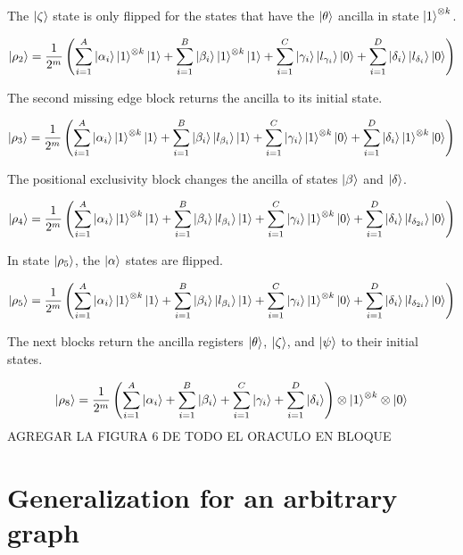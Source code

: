 \documentclass[10pt,a4paper]{article}
\begin{document}
The $\ket{\zeta}$ state is only flipped for the states that have the $\ket{\theta}$ ancilla in state $\ket{1}^{\otimes k}$.

$$
\ket{\rho_2} = \frac{1}{2^m} \left( \sum_{i=1}^{A} \ket{\alpha_i} \ket{1}^{\otimes k} \ket{1} + \sum_{i=1}^{B} \ket{\beta_i} \ket{1}^{\otimes k} \ket{1} + \sum_{i=1}^{C} \ket{\gamma_i} \ket{l_{\gamma_i}} \ket{0} + \sum_{i=1}^{D} \ket{\delta_i} \ket{l_{\delta_i}} \ket{0} \right)
$$

The second missing edge block returns the ancilla to its initial state.

$$
\ket{\rho_3} = \frac{1}{2^m} \left( \sum_{i=1}^{A} \ket{\alpha_i} \ket{1}^{\otimes k} \ket{1} + \sum_{i=1}^{B} \ket{\beta_i} \ket{l_{\beta_i}} \ket{1} + \sum_{i=1}^{C} \ket{\gamma_i} \ket{1}^{\otimes k} \ket{0} + \sum_{i=1}^{D} \ket{\delta_i} \ket{1}^{\otimes k} \ket{0} \right)
$$

The positional exclusivity block changes the ancilla of states $\ket{\beta}$ and $\ket{\delta}$.

$$
\ket{\rho_4} = \frac{1}{2^m} \left( \sum_{i=1}^{A} \ket{\alpha_i} \ket{1}^{\otimes k} \ket{1} + \sum_{i=1}^{B} \ket{\beta_i} \ket{l_{\beta_i}} \ket{1} + \sum_{i=1}^{C} \ket{\gamma_i} \ket{1}^{\otimes k} \ket{0} + \sum_{i=1}^{D} \ket{\delta_i} \ket{l_{\delta_{2i}}} \ket{0} \right)
$$

In state $\ket{\rho_5}$, the $\ket{\alpha}$ states are flipped.

$$
\ket{\rho_5} = \frac{1}{2^m} \left( \sum_{i=1}^{A} \ket{\alpha_i} \ket{1}^{\otimes k} \ket{1} + \sum_{i=1}^{B} \ket{\beta_i} \ket{l_{\beta_i}} \ket{1} + \sum_{i=1}^{C} \ket{\gamma_i} \ket{1}^{\otimes k} \ket{0} + \sum_{i=1}^{D} \ket{\delta_i} \ket{l_{\delta_{2i}}} \ket{0} \right)
$$

The next blocks return the ancilla registers $\ket{\theta}$, $\ket{\zeta}$, and $\ket{\psi}$ to their initial states.

$$
\ket{\rho_8} = \frac{1}{2^m} \left( \sum_{i=1}^{A} \ket{\alpha_i} + \sum_{i=1}^{B} \ket{\beta_i} + \sum_{i=1}^{C} \ket{\gamma_i} + \sum_{i=1}^{D} \ket{\delta_i} \right) \otimes \ket{1}^{\otimes k} \otimes \ket{0}
$$
AGREGAR LA FIGURA 6 DE TODO EL ORACULO EN BLOQUE

\section{Generalization for an arbitrary graph}
\end{document}
